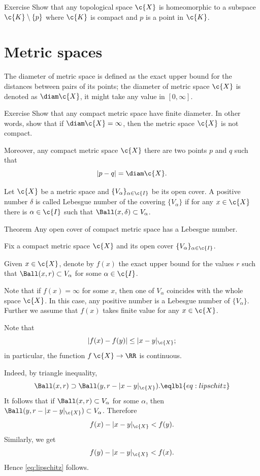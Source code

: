 \begin{thm}{Exercise}
Show that any topological space $\c{X}$ is homeomorphic to a subspace $\c{K}\setminus\{p\}$
where $\c{K}$ is compact and $p$ is a point in $\c{K}$.
\end{thm}

\section{Metric spaces}

The diameter of metric space is defined as the exact upper bound for the distances between pairs of its points;
the diameter of metric space $\c{X}$ is denoted as $\diam \c{X}$, it might take any value in $[0,\infty]$.

\begin{thm}{Exercise}
Show that any compact metric space have finite diameter.
In other words, show that if $\diam\c{X}=\infty$, then the metric space $\c{X}$ is not compact.

Moreover, any compact metric space $\c{X}$ there are two points $p$ and $q$ such that 
\[|p-q|=\diam \c{X}.\]
\end{thm}


Let $\c{X}$ be a metric space and $\{V_\alpha\}_{\alpha\in\c{I}}$ be its open cover.
A positive number $\delta$ is called Lebesgue number of the covering $\{V_\alpha\}$
if for any $x\in \c{X}$ there is $\alpha\in\c{I}$ such that $\Ball(x,\delta)\subset V_\alpha$.

\begin{thm}{Theorem}
Any open cover of compact metric space has a Lebesgue number.
\end{thm}

Fix a compact metric space $\c{X}$ and its open cover $\{V_\alpha\}_{\alpha\in\c{I}}$.

Given $x\in \c{X}$, denote by $f(x)$ the exact upper bound for the values $r$ such that $\Ball(x,r)\subset V_\alpha$ for some $\alpha\in \c{I}$.

Note that if $f(x)=\infty$ for some $x$, then one of $V_\alpha$ coincides with the whole space $\c{X}$.
In this case, any positive number is a Lebesgue number of $\{V_\alpha\}$.
Further we assume that $f(x)$ takes finite value for any $x\in\c{X}$.

Note that 
\[|f(x)-f(y)|\le |x-y|_{\c{X}};\]
in particular, the function $f\:\c{X}\to\RR$ is continuous.

Indeed, by triangle inequality, 
\[\Ball(x,r)\supset \Ball(y,r-|x-y|_{\c{X}}).\eqlbl{eq:lipschitz}\]
It follows that if $\Ball(x,r)\subset V_\alpha$ for some $\alpha$,
then $\Ball(y,r-|x-y|_{\c{X}})\subset V_\alpha$.
Therefore
\[f(x)-|x-y|_{\c{X}}<f(y).\]
Similarly, we get 
\[f(y)-|x-y|_{\c{X}}<f(x).\]
Hence \ref{eq:lipschitz} follows.

